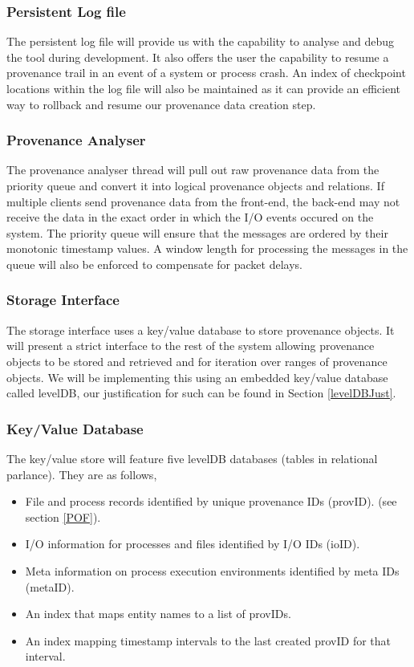 \subsubsection{Persistent Log file}
The persistent log file will provide us with the capability to analyse and debug the tool during development. It also offers the user the capability to resume a provenance trail in an event of a system or process crash. An index of checkpoint locations within the log file will also be maintained as it can provide an efficient way to rollback and resume our provenance data creation step.

\subsubsection{Provenance Analyser}
The provenance analyser thread will pull out raw provenance data from the priority queue and convert it into logical provenance objects and relations. If multiple clients send provenance data from the front-end, the back-end may not receive the data in the exact order in which the I/O events occured on the system. The priority queue will ensure that the messages are ordered by their monotonic timestamp values. A window length for processing the messages in the queue will also be enforced to compensate for packet delays.

\subsubsection{Storage Interface}
The storage interface uses a key/value database to store provenance objects. It will present a strict interface to the rest of the system allowing provenance objects to be stored and retrieved and for iteration over ranges of provenance objects. We will be implementing this using an embedded key/value database called levelDB, our justification for such can be found in Section \ref{levelDBJust}. 

\subsubsection{Key/Value Database}
The key/value store will feature five levelDB databases (tables in relational parlance). They are as follows,
\begin{itemize}
\item File and process records identified by unique provenance IDs (provID). (see section \ref{POF}).
\item I/O information for processes and files identified by I/O IDs (ioID).
\item Meta information on process execution environments identified by meta IDs (metaID).
\item An index that maps entity names to a list of provIDs.
\item An index mapping timestamp intervals to the last created provID for that interval.
\end{itemize}

